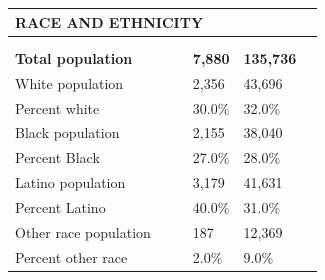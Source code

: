 \documentclass[9pt]{report}
\begin{document}
\vspace{12pt}
\setlength{\tabcolsep}{.01in} %
\begin{tabular}{p{.10in}p{.10in}p{.10in}p{3.7in}>{\hfill}p{.85in}>{\hfill}p{.85in}>{\hfill}p{.85in}>{\hfill}p{.85in}p{0.1in}}
\multicolumn{9}{l}{\parbox{7.1in}{\raggedright{\large{\strut\textbf{RACE AND ETHNICITY}\strut}}}} \\ 
\hline
\multicolumn{4}{l}{\parbox{3.5in}{\raggedright{\textbf{}}}} & \multicolumn{1}{r}{\parbox{.85in}{\strut\raggedleft{\textbf{}\strut}}} & \multicolumn{1}{r}{\parbox{.85in}{\strut\raggedleft{\textbf{}\strut}}} & \multicolumn{1}{r}{\parbox{.85in}{\strut{}}} & \multicolumn{1}{r}{\parbox{.85in}{\strut{}}} & \\ 
\multicolumn{9}{l}{} \\ 
\multicolumn{4}{l}{\parbox{3.5in}{\strut\raggedright{\textbf{Total population}\strut}}} & \textbf{} & \textbf{} & \textbf{7,880} & \textbf{135,736} & \textbf{} \\ 
\multicolumn{4}{l}{\parbox{3.6in}{\strut\raggedright{{White population}}\strut}} &  &  & 2,356 & 43,696 & \multicolumn{1}{l}{}  \\ 
\multicolumn{4}{l}{\parbox{3.6in}{\strut\raggedright{{Percent white}}\strut}} &  &  & 30.0\% & 32.0\% & \multicolumn{1}{l}{}  \\ 
\multicolumn{4}{l}{\parbox{3.6in}{\strut\raggedright{{Black population}}\strut}} &  &  & 2,155 & 38,040 & \multicolumn{1}{l}{}  \\ 
\multicolumn{4}{l}{\parbox{3.6in}{\strut\raggedright{{Percent Black}}\strut}} &  &  & 27.0\% & 28.0\% & \multicolumn{1}{l}{}  \\ 
\multicolumn{4}{l}{\parbox{3.6in}{\strut\raggedright{{Latino population}}\strut}} &  &  & 3,179 & 41,631 & \multicolumn{1}{l}{}  \\ 
\multicolumn{4}{l}{\parbox{3.6in}{\strut\raggedright{{Percent Latino}}\strut}} &  &  & 40.0\% & 31.0\% & \multicolumn{1}{l}{}  \\ 
\multicolumn{4}{l}{\parbox{3.6in}{\strut\raggedright{{Other race population}}\strut}} &  &  & 187 & 12,369 & \multicolumn{1}{l}{}  \\ 
\multicolumn{4}{l}{\parbox{3.6in}{\strut\raggedright{{Percent other race}}\strut}} &  &  & 2.0\% & 9.0\% & \multicolumn{1}{l}{}  \\ 

\end{tabular}
\setlength{\tabcolsep}{6pt} %
\end{document}
